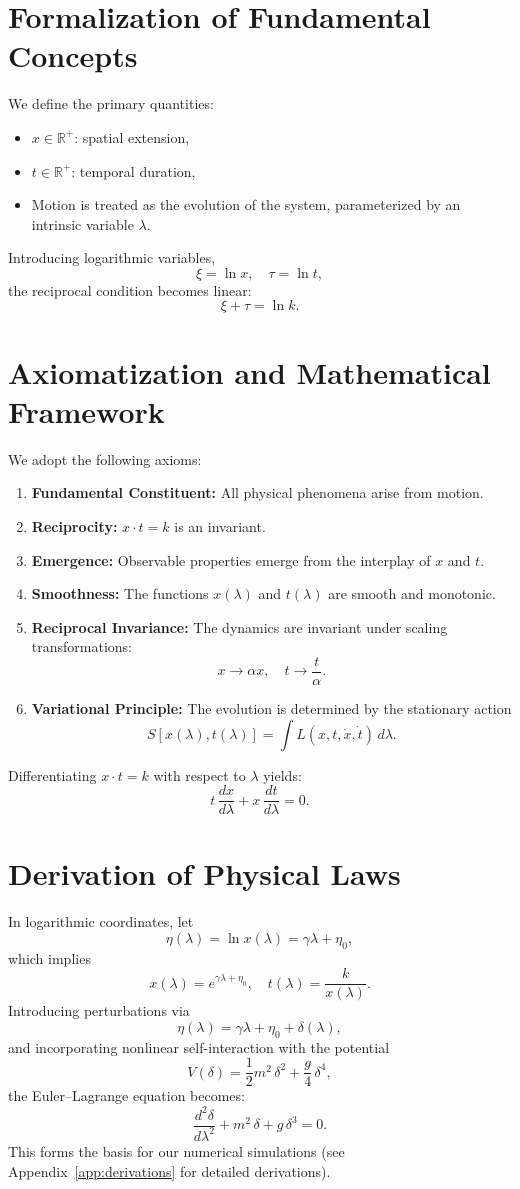 \documentclass{article}
\begin{document}
\section{Formalization of Fundamental Concepts}
We define the primary quantities:
\begin{itemize}
    \item \( x \in \mathbb{R}^+ \): spatial extension,
    \item \( t \in \mathbb{R}^+ \): temporal duration,
    \item Motion is treated as the evolution of the system, parameterized by an intrinsic variable \( \lambda \).
\end{itemize}
Introducing logarithmic variables,
\[
\xi = \ln x, \quad \tau = \ln t,
\]
the reciprocal condition becomes linear:
\[
\xi + \tau = \ln k.
\]

\section{Axiomatization and Mathematical Framework}
We adopt the following axioms:
\begin{enumerate}
    \item \textbf{Fundamental Constituent:} All physical phenomena arise from motion.
    \item \textbf{Reciprocity:} \( x \cdot t = k \) is an invariant.
    \item \textbf{Emergence:} Observable properties emerge from the interplay of \( x \) and \( t \).
    \item \textbf{Smoothness:} The functions \( x(\lambda) \) and \( t(\lambda) \) are smooth and monotonic.
    \item \textbf{Reciprocal Invariance:} The dynamics are invariant under scaling transformations:
    \[
    x \to \alpha x,\quad t \to \frac{t}{\alpha}.
    \]
    \item \textbf{Variational Principle:} The evolution is determined by the stationary action
    \[
    S[x(\lambda),t(\lambda)] = \int L(x,t,\dot{x},\dot{t})\,d\lambda.
    \]
\end{enumerate}
Differentiating \( x \cdot t = k \) with respect to \( \lambda \) yields:
\[
t\,\frac{dx}{d\lambda} + x\,\frac{dt}{d\lambda} = 0.
\]

\section{Derivation of Physical Laws}
In logarithmic coordinates, let
\[
\eta(\lambda) = \ln x(\lambda) = \gamma\lambda + \eta_0,
\]
which implies
\[
x(\lambda) = e^{\gamma\lambda+\eta_0}, \quad t(\lambda) = \frac{k}{x(\lambda)}.
\]
Introducing perturbations via
\[
\eta(\lambda) = \gamma\lambda + \eta_0 + \delta(\lambda),
\]
and incorporating nonlinear self-interaction with the potential
\[
V(\delta) = \frac{1}{2}m^2\,\delta^2 + \frac{g}{4}\,\delta^4,
\]
the Euler--Lagrange equation becomes:
\[
\frac{d^2\delta}{d\lambda^2} + m^2\,\delta + g\,\delta^3 = 0.
\]
This forms the basis for our numerical simulations (see Appendix~\ref{app:derivations} for detailed derivations).
\end{document}
